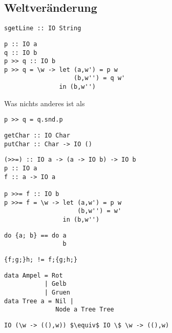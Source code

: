 	\subsection{Weltveränderung} %
	\label{sub:weltveraenderung}
		\lstHaskell
		\begin{lstlisting}[morekeywords={sgetLine}]
sgetLine :: IO String
		\end{lstlisting}
		\lstHaskell
		\begin{lstlisting}
p :: IO a
q :: IO b
p >> q :: IO b
p >> q = \w -> let (a,w') = p w
                   (b,w'') = q w'
               in (b,w'')
		\end{lstlisting}
		Was nichts anderes ist als
		\lstHaskell
		\begin{lstlisting}
p >> q = q.snd.p
		\end{lstlisting}
		\lstHaskell
		\begin{lstlisting}
getChar :: IO Char
putChar :: Char -> IO ()
		\end{lstlisting}
		\lstHaskell
		\begin{lstlisting}
(>>=) :: IO a -> (a -> IO b) -> IO b
p :: IO a
f :: a -> IO a

p >>= f :: IO b
p >>= f = \w -> let (a,w') = p w
                    (b,w'') = w'
                in (b,w'')
		\end{lstlisting}
		\lstHaskell
		\begin{lstlisting}
do {a; b} == do a
                b
		\end{lstlisting}
		\lstHaskell
		\begin{lstlisting}
{f;g;}h; != f;{g;h;}
		\end{lstlisting}
		\lstHaskell
		\begin{lstlisting}
data Ampel = Rot
           | Gelb
           | Gruen
data Tree a = Nil |
              Node a Tree Tree
		\end{lstlisting}
		\lstHaskell
		\begin{lstlisting}[mathescape]
IO (\w -> ((),w)) $\equiv$ IO \$ \w -> ((),w)
		\end{lstlisting}

